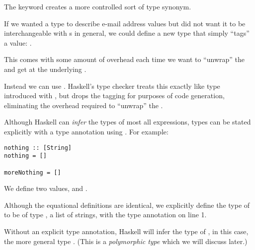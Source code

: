 \begin{notelist}
\item The keyword  creates a more controlled sort of type synonym.
\begin{notelist}
    \item If we wanted a type to describe e-mail address values but did not want it to be
          interchangeable with s in general, we could define a new type that simply ``tags''
          a  value: .
    \item This comes with some amount of overhead each time we want to ``unwrap'' the  and
          get at the underlying .
    \item Instead we can use . Haskell's type checker treats
          this exactly like type introduced with , but drops the tagging for purposes of code
          generation, eliminating the overhead required to ``unwrap'' the .
\end{notelist}

\item Although Haskell can \textit{infer} the types of most all expressions, types can be stated explicitly
      with a type annotation using \code{::}. For example:
\begin{lstlisting}
nothing :: [String]
nothing = []

moreNothing = []
\end{lstlisting}
\begin{notelist}
    \item We define two values,  and .
    \item Although the equational definitions are identical, we explicitly define the type of
           to be of type \code{[String]}, a list of strings, with the type
          annotation on line 1.
    \item Without an explicit type annotation, Haskell will infer the type of ,
          in this case, the more general type \code{[a]}. (This is a \textit{polymorphic type} which
          we will discuss later.)
\end{notelist}


\end{notelist}
